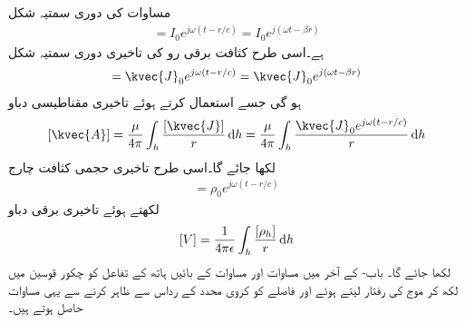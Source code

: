 مساوات  کی دوری سمتیہ شکل
\begin{align}
[I]=I_0 e^{j \omega (t-r/c)}=I_0 e^{j(\omega t-\beta r)}
\end{align}
ہے۔اسی طرح کثافت برقی رو کی تاخیری دوری سمتیہ شکل
\begin{align}
[\kvec{J}]=\kvec{J}_0 e^{j \omega (t-r/c)}=\kvec{J}_0 e^{j(\omega  t -\beta r)}
\end{align}
ہو گی جسے استعمال کرتے ہوئے تاخیری مقناطیسی دباو
\begin{align}\label{مساوات_اینٹینا_تاخیری_سمتی_دباو}
[\kvec{A}]=\frac{\mu}{4\pi}\int_h \frac{[\kvec{J}]}{r}\dif h=\frac{\mu}{4\pi}\int_h \frac{\kvec{J}_0 e^{j\omega(t-r/c)}}{r} \dif h
\end{align}
لکھا جائے گا۔اسی طرح تاخیری حجمی کثافت چارج
\begin{align}
[\rho_h]= \rho_0 e^{j\omega \left(t-r/c \right)}
\end{align}
لکھتے ہوئے تاخیری برقی دباو
\begin{align}\label{مساوات_اینٹینا_تاخیری_مقداری_دباو}
[V]=\frac{1}{4\pi \epsilon}\int_h \frac{[\rho_h]}{ r} \dif h
\end{align}
لکھا جائے گا۔ باب- کے آخر میں مساوات  اور مساوات  کے بائیں ہاتھ کے تفاعل کو چکور قوسین میں لکھ کر موج کی رفتار  لیتے ہوئے اور فاصلے  کو کروی محدد کے رداس  سے ظاہر کرنے سے  یہی مساوات حاصل ہوتے ہیں۔

